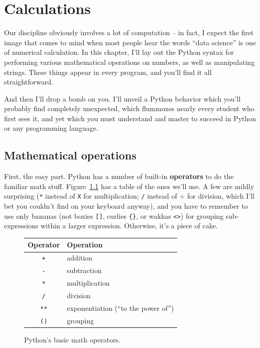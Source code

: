 

\chapter{Calculations}
\label{ch:calculations}

Our discipline obviously involves a lot of computation -- in fact, I expect the
first image that comes to mind when most people hear the words ``data science''
is one of numerical calculation. In this chapter, I'll lay out the Python
syntax for performing various mathematical operations on numbers, as well as
manipulating strings. These things appear in every program, and you'll find it
all straightforward.

And then I'll drop a bomb on you. I'll unveil a Python behavior which you'll
probably find completely unexpected, which flummoxes nearly every student who
first sees it, and yet which you must understand and master to succeed in
Python or any programming language.

\section{Mathematical operations}


First, the easy part. Python has a number of built-in \textbf{operators} to do
the familiar math stuff. Figure~\ref{fig:mathOps} has a table of the ones we'll
use. A few are mildly surprising (\texttt{*} instead of \texttt{X} for
multiplication; \texttt{/} instead of $\div$ for division, which I'll bet you
couldn't find on your keyboard anyway), and you have to remember to use only
bananas (not boxies \texttt{[]}, curlies \texttt{\{\}}, or wakkas \texttt{<>})
for grouping sub-expressions within a larger expression. Otherwise, it's a
piece of cake.

\begin{figure}[ht]
\centering
\begin{tabular}{c | l}
\hline
Operator & Operation \\
\hline
\texttt{+} & addition \\
\texttt{-} & subtraction \\
\texttt{*} & multiplication \\
\texttt{/} & division \\
\texttt{**} & exponentiation (``to the power of'')\\
\texttt{()} & grouping \\
\hline
\end{tabular}
\smallskip
\caption{Python's basic math operators.}
\label{fig:mathOps}
\end{figure}

